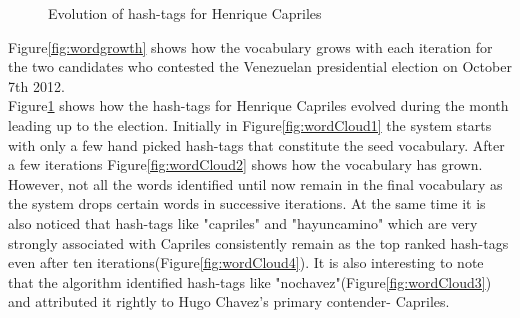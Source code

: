 \begin{figure}
{		\label{fig:wordCloud3}
	}
	\caption{Evolution of hash-tags for Henrique Capriles} 
	\label{fig:wordCloud}
\end{figure}

Figure\ref{fig:wordgrowth} shows  how the vocabulary grows with each iteration for the two candidates who contested the Venezuelan presidential election on October 7th 2012.\\
Figure\ref{fig:wordCloud} shows how the hash-tags for Henrique Capriles evolved during the month leading up to the election.
Initially in Figure\ref{fig:wordCloud1} the system starts with only a few hand picked hash-tags that constitute the seed vocabulary. 
After a few iterations Figure\ref{fig:wordCloud2} shows how the vocabulary has grown.
However, not all the words identified until now remain in the final vocabulary as the system drops certain words in successive iterations.
At the same time it is also noticed that hash-tags like "capriles" and "hayuncamino" which are very strongly associated with Capriles consistently remain as the top ranked hash-tags even after ten iterations(Figure\ref{fig:wordCloud4}). 
It is also interesting to note that the algorithm identified hash-tags like "nochavez"(Figure\ref{fig:wordCloud3}) and attributed it rightly to Hugo Chavez's primary contender- Capriles. \\
